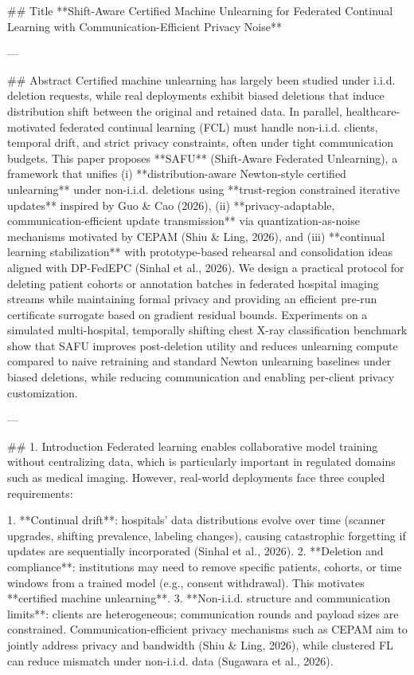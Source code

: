 ## Title
**Shift-Aware Certified Machine Unlearning for Federated Continual Learning with Communication-Efficient Privacy Noise**

---

## Abstract
Certified machine unlearning has largely been studied under i.i.d. deletion requests, while real deployments exhibit biased deletions that induce distribution shift between the original and retained data. In parallel, healthcare-motivated federated continual learning (FCL) must handle non-i.i.d. clients, temporal drift, and strict privacy constraints, often under tight communication budgets. This paper proposes **SAFU** (Shift-Aware Federated Unlearning), a framework that unifies (i) **distribution-aware Newton-style certified unlearning** under non-i.i.d. deletions using **trust-region constrained iterative updates** inspired by Guo & Cao (2026), (ii) **privacy-adaptable, communication-efficient update transmission** via quantization-as-noise mechanisms motivated by CEPAM (Shiu & Ling, 2026), and (iii) **continual learning stabilization** with prototype-based rehearsal and consolidation ideas aligned with DP-FedEPC (Sinhal et al., 2026). We design a practical protocol for deleting patient cohorts or annotation batches in federated hospital imaging streams while maintaining formal privacy and providing an efficient pre-run certificate surrogate based on gradient residual bounds. Experiments on a simulated multi-hospital, temporally shifting chest X-ray classification benchmark show that SAFU improves post-deletion utility and reduces unlearning compute compared to naive retraining and standard Newton unlearning baselines under biased deletions, while reducing communication and enabling per-client privacy customization.

---

## 1. Introduction
Federated learning enables collaborative model training without centralizing data, which is particularly important in regulated domains such as medical imaging. However, real-world deployments face three coupled requirements:

1. **Continual drift**: hospitals’ data distributions evolve over time (scanner upgrades, shifting prevalence, labeling changes), causing catastrophic forgetting if updates are sequentially incorporated (Sinhal et al., 2026).
2. **Deletion and compliance**: institutions may need to remove specific patients, cohorts, or time windows from a trained model (e.g., consent withdrawal). This motivates **certified machine unlearning**.
3. **Non-i.i.d. structure and communication limits**: clients are heterogeneous; communication rounds and payload sizes are constrained. Communication-efficient privacy mechanisms such as CEPAM aim to jointly address privacy and bandwidth (Shiu & Ling, 2026), while clustered FL can reduce mismatch under non-i.i.d. data (Sugawara et al., 2026).

